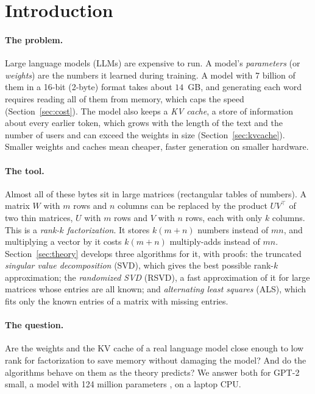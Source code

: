 \documentclass[10pt]{article}
\theoremstyle{plain}
\theoremstyle{definition}
\theoremstyle{remark}
\newcommand{\T}{^{\top}}
\begin{document}
\tableofcontents
\newpage

\section{Introduction}
\label{sec:intro}

\paragraph{The problem.}
Large language models (LLMs) are expensive to run. A model's \emph{parameters} (or \emph{weights}) are the numbers it learned during training. A model with 7 billion of them in a 16-bit (2-byte) format takes about $14$~GB, and generating each word requires reading all of them from memory, which caps the speed (Section~\ref{sec:cost}). The model also keeps a \emph{KV cache}, a store of information about every earlier token, which grows with the length of the text and the number of users and can exceed the weights in size (Section~\ref{sec:kvcache}). Smaller weights and caches mean cheaper, faster generation on smaller hardware.

\paragraph{The tool.}
Almost all of these bytes sit in large matrices (rectangular tables of numbers). A matrix $W$ with $m$ rows and $n$ columns can be replaced by the product $UV\T$ of two thin matrices, $U$ with $m$ rows and $V$ with $n$ rows, each with only $k$ columns. This is a \emph{rank-$k$ factorization}. It stores $k(m+n)$ numbers instead of $mn$, and multiplying a vector by it costs $k(m+n)$ multiply-adds instead of $mn$. Section~\ref{sec:theory} develops three algorithms for it, with proofs: the truncated \emph{singular value decomposition} (SVD), which gives the best possible rank-$k$ approximation; the \emph{randomized SVD} (RSVD), a fast approximation of it for large matrices whose entries are all known; and \emph{alternating least squares} (ALS), which fits only the known entries of a matrix with missing entries.

\paragraph{The question.}
Are the weights and the KV cache of a real language model close enough to low rank for factorization to save memory without damaging the model? And do the algorithms behave on them as the theory predicts? We answer both for GPT-2 small, a model with 124 million parameters \cite{radford2019}, on a laptop CPU.
\end{document}
